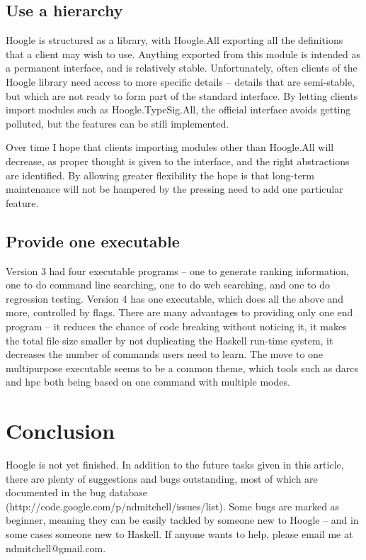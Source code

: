 \documentclass{tmr}
\newcommand{\code}[1]{\textsf{#1}}
\begin{document}
\subsection{Use a hierarchy}

Hoogle is structured as a library, with \code{Hoogle.All} exporting all the definitions that a client may wish to use. Anything exported from this module is intended as a permanent interface, and is relatively stable. Unfortunately, often clients of the Hoogle library need access to more specific details -- details that are semi-stable, but which are not ready to form part of the standard interface. By letting clients import modules such as \code{Hoogle.TypeSig.All}, the official interface avoids getting polluted, but the features can be still implemented.

Over time I hope that clients importing modules other than \code{Hoogle.All} will decrease, as proper thought is given to the interface, and the right abstractions are identified. By allowing greater flexibility the hope is that long-term maintenance will not be hampered by the pressing need to add one particular feature.

\subsection{Provide one executable}

Version 3 had four executable programs -- one to generate ranking information, one to do command line searching, one to do web searching, and one to do regression testing. Version 4 has one executable, which does all the above and more, controlled by flags. There are many advantages to providing only one end program -- it reduces the chance of code breaking without noticing it, it makes the total file size smaller by not duplicating the Haskell run-time system, it decreases the number of commands users need to learn. The move to one multipurpose executable seems to be a common theme, which tools such as darcs and hpc both being based on one command with multiple modes.

\section{Conclusion}

Hoogle is not yet finished. In addition to the future tasks given in this article, there are plenty of suggestions and bugs outstanding, most of which are documented in the bug database (\textsf{http://code.google.com/p/ndmitchell/issues/list}). Some bugs are marked as beginner, meaning they can be easily tackled by someone new to Hoogle -- and in some cases someone new to Haskell. If anyone wants to help, please email me at \textsf{ndmitchell@gmail.com}.
\end{document}
